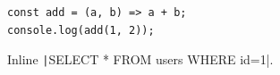 \documentclass{article}
\begin{document}
\begin{verbatim}
const add = (a, b) => a + b;
console.log(add(1, 2));
\end{verbatim}
Inline \texttt|SELECT * FROM users WHERE id=1|.
\end{document}
